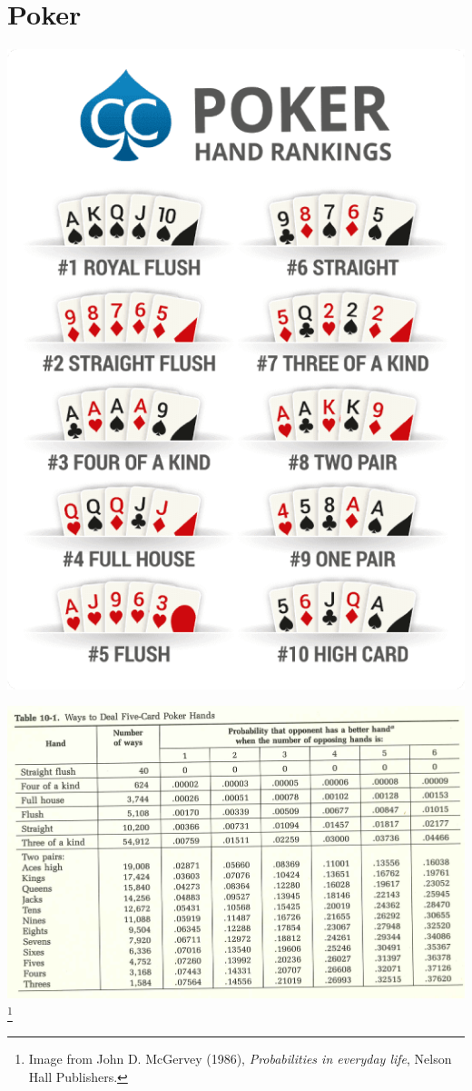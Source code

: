 \documentclass[9pt]{beamer}
\begin{document}
\section{Poker}%
\begin{frame}[fragile,t] %
\begin{center}
	\includegraphics[scale=0.25]{figs/poker-hand-rankings-small.png}
\end{center}
\end{frame}
\begin{frame}[fragile,t] %
\begin{center}
	\includegraphics[scale=0.25]{figs/Poker-1.png}
  \footnote{Image from John D. McGervey (1986), {\it Probabilities in everyday life}, Nelson Hall
  Publishers.}
\end{center}
\end{frame}
\end{document}
